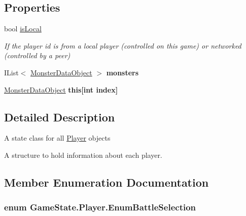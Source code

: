 \subsection*{Properties}
\begin{DoxyCompactItemize}
\item 
bool \hyperlink{class_game_state_1_1_player_affd7c601a6d763dafdc59a58c415e9e7}{is\-Local}
\begin{DoxyCompactList}\small\item\em If the player id is from a local player (controlled on this game) or networked (controlled by a peer) \end{DoxyCompactList}\item 
\hypertarget{class_game_state_1_1_player_aebfa739a98ff4f88d151235905b439bf}{I\-List$<$ \hyperlink{class_monster_data_object}{Monster\-Data\-Object} $>$ {\bfseries monsters}}\label{class_game_state_1_1_player_aebfa739a98ff4f88d151235905b439bf}

\item 
\hypertarget{class_game_state_1_1_player_ab8dafc199bbda42740ab5f3587202495}{\hyperlink{class_monster_data_object}{Monster\-Data\-Object} {\bfseries this\mbox{[}int index\mbox{]}}}\label{class_game_state_1_1_player_ab8dafc199bbda42740ab5f3587202495}

\end{DoxyCompactItemize}


\subsection{Detailed Description}
A state class for all \hyperlink{class_game_state_1_1_player}{Player} objects 

A structure to hold information about each player.

\subsection{Member Enumeration Documentation}
\hypertarget{class_game_state_1_1_player_a9f54c5eca1e60acbaa2074e981f51615}{
\subsubsection[{Enum\-Battle\-Selection}]{\setlength{\rightskip}{0pt plus 5cm}enum {\bf Game\-State.\-Player.\-Enum\-Battle\-Selection}}}\label{class_game_state_1_1_player_a9f54c5eca1e60acbaa2074e981f51615}


